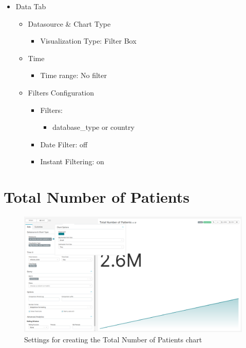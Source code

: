 \documentclass[
]{book}
\providecommand{\tightlist}{%
  \setlength{\itemsep}{0pt}\setlength{\parskip}{0pt}}
\begin{document}
\begin{itemize}
\item
  Data Tab

  \begin{itemize}
  \item
    Datasource \& Chart Type

    \begin{itemize}
    \tightlist
    \item
      Visualization Type: Filter Box
    \end{itemize}
  \item
    Time

    \begin{itemize}
    \tightlist
    \item
      Time range: No filter
    \end{itemize}
  \item
    Filters Configuration

    \begin{itemize}
    \item
      Filters:

      \begin{itemize}
      \tightlist
      \item
        database\_type or country
      \end{itemize}
    \item
      Date Filter: off
    \item
      Instant Filtering: on
    \end{itemize}
  \end{itemize}
\end{itemize}

\hypertarget{total-number-of-patients}{%
\section{Total Number of Patients}\label{total-number-of-patients}}

\begin{figure}
\includegraphics[width=1\linewidth]{images/03-general/02-total_number_of_patients} \caption{Settings for creating the Total Number of Patients chart}\label{fig:totalNumberOfPatients}
\end{figure}
\end{document}
